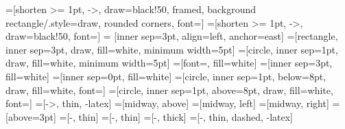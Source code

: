 =[shorten >= 1pt, ->, draw=black!50, framed, background rectangle/.style={draw, rounded corners}, font=\scriptsize ]
=[shorten >= 1pt, ->, draw=black!50, font=\scriptsize]
 = [inner sep=3pt, align=left, anchor=east]
=[rectangle, inner sep=3pt, draw, fill=white, minimum width=5pt]
=[circle, inner sep=1pt, draw, fill=white, minimum width=5pt]
=[font=\Large, fill=white]
=[inner sep=3pt, fill=white]
=[inner sep=0pt, fill=white]
=[circle, inner sep=1pt, below=8pt, draw, fill=white, font=\tiny]
=[circle, inner sep=1pt, above=8pt, draw, fill=white, font=\tiny]
=[->, thin, -latex]
=[midway, above]
=[midway, left]
=[midway, right]
=[above=3pt]
=[-, thin]
=[-, thin]
=[-, thick]
=[-, thin, dashed, -latex]

\newcommand{\ridX}{-0.3}
\newcommand{\ridY}{0.5}
\newcommand{\lhsX}{-0.3}
\newcommand{\pipeUY}{-1}
\newcommand{\pipeBY}{0.5}

